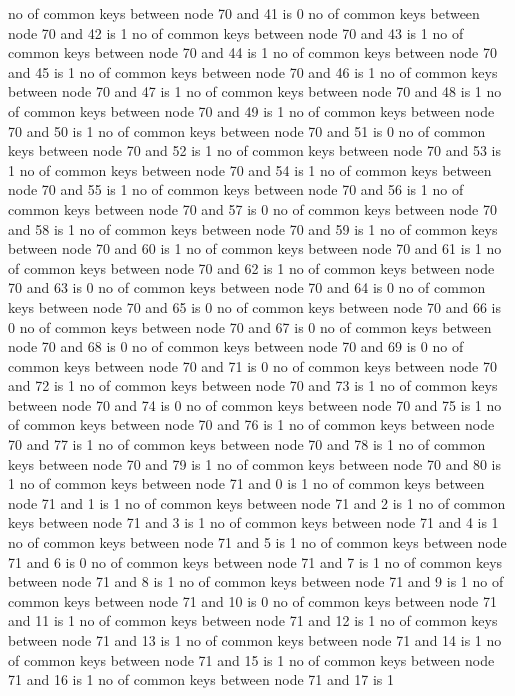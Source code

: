 no of common keys between node 70 and 41 is 0
no of common keys between node 70 and 42 is 1
no of common keys between node 70 and 43 is 1
no of common keys between node 70 and 44 is 1
no of common keys between node 70 and 45 is 1
no of common keys between node 70 and 46 is 1
no of common keys between node 70 and 47 is 1
no of common keys between node 70 and 48 is 1
no of common keys between node 70 and 49 is 1
no of common keys between node 70 and 50 is 1
no of common keys between node 70 and 51 is 0
no of common keys between node 70 and 52 is 1
no of common keys between node 70 and 53 is 1
no of common keys between node 70 and 54 is 1
no of common keys between node 70 and 55 is 1
no of common keys between node 70 and 56 is 1
no of common keys between node 70 and 57 is 0
no of common keys between node 70 and 58 is 1
no of common keys between node 70 and 59 is 1
no of common keys between node 70 and 60 is 1
no of common keys between node 70 and 61 is 1
no of common keys between node 70 and 62 is 1
no of common keys between node 70 and 63 is 0
no of common keys between node 70 and 64 is 0
no of common keys between node 70 and 65 is 0
no of common keys between node 70 and 66 is 0
no of common keys between node 70 and 67 is 0
no of common keys between node 70 and 68 is 0
no of common keys between node 70 and 69 is 0
no of common keys between node 70 and 71 is 0
no of common keys between node 70 and 72 is 1
no of common keys between node 70 and 73 is 1
no of common keys between node 70 and 74 is 0
no of common keys between node 70 and 75 is 1
no of common keys between node 70 and 76 is 1
no of common keys between node 70 and 77 is 1
no of common keys between node 70 and 78 is 1
no of common keys between node 70 and 79 is 1
no of common keys between node 70 and 80 is 1
no of common keys between node 71 and 0 is 1
no of common keys between node 71 and 1 is 1
no of common keys between node 71 and 2 is 1
no of common keys between node 71 and 3 is 1
no of common keys between node 71 and 4 is 1
no of common keys between node 71 and 5 is 1
no of common keys between node 71 and 6 is 0
no of common keys between node 71 and 7 is 1
no of common keys between node 71 and 8 is 1
no of common keys between node 71 and 9 is 1
no of common keys between node 71 and 10 is 0
no of common keys between node 71 and 11 is 1
no of common keys between node 71 and 12 is 1
no of common keys between node 71 and 13 is 1
no of common keys between node 71 and 14 is 1
no of common keys between node 71 and 15 is 1
no of common keys between node 71 and 16 is 1
no of common keys between node 71 and 17 is 1
